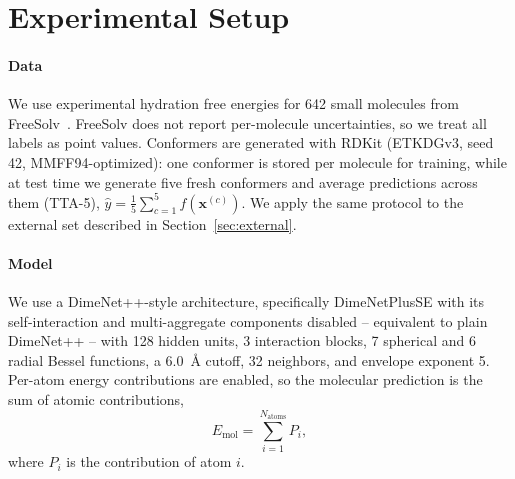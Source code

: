 \documentclass{article}
\begin{document}




\section{Experimental Setup}
\label{sec:setup}

\paragraph{Data} We use experimental hydration free energies for 642 small
molecules from FreeSolv~\cite{mobley2014freesolv}. FreeSolv does not report
per-molecule uncertainties, so we treat all labels as point values. Conformers
are generated with RDKit (ETKDGv3, seed 42, MMFF94-optimized): one conformer
is stored per molecule for training, while at test time we generate five
fresh conformers and average predictions across them (TTA-5),
$\hat{y} = \frac{1}{5}\sum_{c=1}^{5} f(\mathbf{x}^{(c)})$. We apply the same
protocol to the external set described in Section~\ref{sec:external}.

\paragraph{Model} We use a DimeNet++-style architecture, specifically
DimeNetPlusSE with its self-interaction and multi-aggregate components
disabled -- equivalent to plain DimeNet++ -- with 128 hidden units, 3
interaction blocks, 7 spherical and 6 radial Bessel functions, a 6.0~\AA{}
cutoff, 32 neighbors, and envelope exponent 5. Per-atom energy contributions
are enabled, so the molecular prediction is the sum of atomic contributions,
\[
E_{\mathrm{mol}} = \sum_{i=1}^{N_{\mathrm{atoms}}} P_i ,
\]
where $P_i$ is the contribution of atom $i$.
\end{document}

